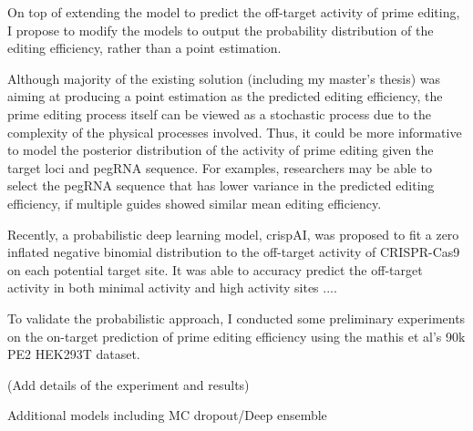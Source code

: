 \documentclass[a4,12pt]{article}
\begin{document}
On top of extending the model to predict the off-target activity of prime editing, I propose to modify the models to output the probability distribution of the editing efficiency, rather than a point estimation.

Although majority of the existing solution (including my master's thesis) was aiming at producing a point estimation as the predicted editing efficiency\parencite{mathisMachineLearningPrediction2024,yuPredictionEfficienciesDiverse2023,koeppelPredictionPrimeEditing2023}, the prime editing process itself can be viewed as a stochastic process due to the complexity of the physical processes involved. Thus, it could be more informative to model the posterior distribution of the activity of prime editing given the target loci and pegRNA sequence. For examples, researchers may be able to select the pegRNA sequence that has lower variance in the predicted editing efficiency, if multiple guides showed similar mean editing efficiency.

Recently, a probabilistic deep learning model, crispAI, was proposed to fit a zero inflated negative binomial distribution to the off-target activity of CRISPR-Cas9 on each potential target site\parencite{ozdenLearningQuantifyUncertainty2024}. It was able to accuracy predict the off-target activity in both minimal activity and high activity sites ....

To validate the probabilistic approach, I conducted some preliminary experiments on the on-target prediction of prime editing efficiency using the mathis et al's 90k PE2 HEK293T dataset\parencite{mathisPredictingPrimeEditing2023}. 

(Add details of the experiment and results)

Additional models including MC dropout/Deep ensemble
\end{document}
